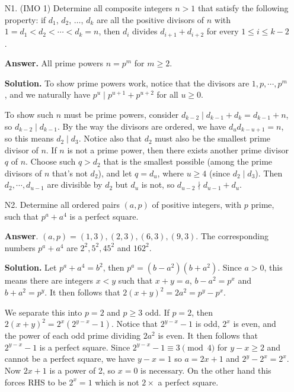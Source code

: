 \documentclass[11pt,a4paper]{article}
\begin{document}
    \begin{enumerate}
    	\item [N1.] (IMO 1) Determine all composite integers $n>1$ that satisfy the following property: if $d_1$, $d_2$, $\ldots$, $d_k$ are all the positive divisors of $n$ with $1 = d_1 < d_2 < \cdots < d_k = n$, then $d_i$ divides $d_{i+1} + d_{i+2}$ for every $1 \leq i \leq k - 2$.
    	
    	\textbf{Answer.} All prime powers $n = p^m$ for $m\ge 2$. 
    	
    	\textbf{Solution.} 
    	To show prime powers work, 
    	notice that the divisors are $1, p, \cdots, p^m$, 
    	and we naturally have $p^u\mid p^{u+1} + p^{u+2}$ for all $u\ge 0$. 
    	
    	To show such $n$ must be prime powers, 
    	consider $d_{k-2} \mid d_{k-1} + d_k = d_{k-1} + n$, 
    	so $d_{k-2} \mid d_{k-1}$. 
    	By the way the divisors are ordered, we have $d_ud_{k - u + 1} = n$, 
    	so this means $d_2\mid d_3$. 
    	Notice also that $d_2$ must also be the smallest prime divisor of $n$. 
    	If $n$ is not a prime power, then there exists another prime divisor $q$ of $n$. 
    	Choose such $q > d_2$ that is the smallest possible 
    	(among the prime divisors of $n$ that's not $d_2$), 
    	and let $q=d_u$, where $u\ge 4$ (since $d_2\mid d_3$).  
    	Then $d_2, \cdots, d_{u-1}$ are divisible by $d_2$ but $d_u$ is not, 
    	so $d_{u-2}\nmid d_{u-1}+d_u$. 
    	
    	\item [N2.] 
    	Determine all ordered pairs $(a,p)$ of positive integers, with $p$ prime, such that $p^a+a^4$ is a perfect square.
    	
    	\textbf{Answer}. $(a, p) = (1, 3), (2, 3), (6, 3), (9, 3)$. The corresponding numbers $p^a+a^4$ are $2^2, 5^2, 45^2$ and $162^2$. 
    	
    	\textbf{Solution.} Let $p^a + a^4 = b^2$, 
    	then $p^a = (b - a^2)(b + a^2)$. 
    	Since $a > 0$, 
    	this means there are integers $x < y$ such that $x + y = a$, 
    	$b - a^2 = p^x$ and $b + a^2 = p^y$. 
    	It then follows that $2(x + y)^2 = 2a^2 = p^y - p^x$. 
    	
    	We separate this into $p = 2$ and $p\ge 3$ odd. 
    	If $p = 2$, then $2(x + y)^2 = 2^x(2^{y - x} - 1)$. 
    	Notice that $2^{y - x} - 1$ is odd, $2^x$ is even, 
    	and the power of each odd prime dividing $2a^2$ is even. 
    	It then follows that $2^{y - x} - 1$ is a perfect square. 
    	Since $2^{y - x} - 1\equiv 3\pmod{4}$ for $y - x\ge 2$ and 
    	cannot be a perfect square, 
    	we have $y - x = 1$ so $a = 2x + 1$ and $2^y - 2^x = 2^x$. 
    	Now $2x + 1$ is a power of 2, 
    	so $x = 0$ is necessary. On the other hand this forces RHS to be $2^x = 1$ which is not $2\times$ a perfect square. 
    	

\end{enumerate}
\end{document}
